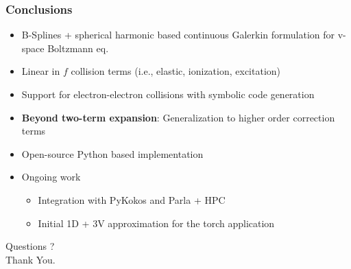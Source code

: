 \documentclass[mathserif, aspectratio=169]{beamer}
\begin{document}
\begin{frame}
	\frametitle{Conclusions}
	\begin{itemize}
		\item B-Splines + spherical harmonic based continuous Galerkin formulation for v-space Boltzmann eq.
		\item Linear in $f$ collision terms (i.e., elastic, ionization, excitation)
		\item Support for electron-electron collisions with symbolic code generation
		\item \textbf{Beyond two-term expansion}: Generalization to higher order correction terms 
		\item Open-source Python based implementation
		\item Ongoing work
		\begin{itemize}
			\item Integration with PyKokos and Parla + HPC 
			\item Initial 1D + 3V approximation for the torch application
		\end{itemize}
	\end{itemize}
\end{frame}

\begin{frame}
	\centering
	\Huge Questions ? \\
	\centering
	\Huge Thank You. 
\end{frame}
\end{document}
